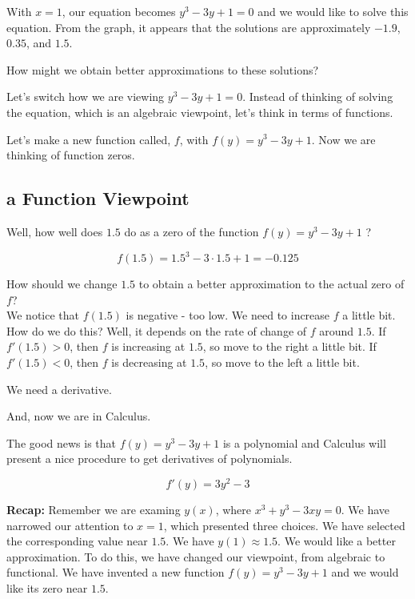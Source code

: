 \documentclass{ximera}
\begin{document}
With $x=1$, our equation becomes $y^3 - 3 y + 1 = 0$ and we would like to solve this equation. From the graph, it appears that the solutions are approximately $-1.9$, $0.35$, and $1.5$.

How might we obtain better approximations to these solutions?





Let's switch how we are viewing $y^3 - 3 y + 1 = 0$.  Instead of thinking of solving the equation, which is an algebraic viewpoint, let's think in terms of functions.

Let's make a new function called, $f$, with $f(y) = y^3 - 3 y + 1$.  Now we are thinking of function zeros. \\








\subsection{a Function Viewpoint}


Well, how well does $1.5$ do as a zero of the function $f(y) = y^3 - 3 y + 1$ ?


\[  f(1.5) = 1.5^3 - 3 \cdot 1.5 + 1 = -0.125 \]


How should we change $1.5$ to obtain a better approximation to the actual zero of $f$? \\


We notice that $f(1.5)$ is negative - too low.  We need to increase $f$ a little bit.  How do we do this?  Well, it depends on the rate of change of $f$ around $1.5$.  If $f'(1.5) > 0$, then $f$ is increasing at $1.5$, so move to the right a little bit. If $f'(1.5) < 0$, then $f$ is decreasing at $1.5$, so move to the left a little bit. 



We need a derivative.

And, now we are in Calculus.





The good news is that $f(y) = y^3 - 3 y + 1$ is a polynomial and Calculus will present a nice procedure to get derivatives of polynomials.


\[
f'(y) = 3 y^2 - 3
\]




\textbf{Recap: } Remember we are examing $y(x)$, where $x^3 + y^3 - 3xy = 0$.  We have narrowed our attention to $x=1$, which presented three choices. We have selected the corresponding value near $1.5$.  We have $y(1) \approx 1.5$. We would like a better approximation.  To do this, we have changed our viewpoint, from algebraic to functional.  We have invented a new function $f(y) = y^3 - 3 y + 1$ and we would like its zero near $1.5$.
\end{document}
